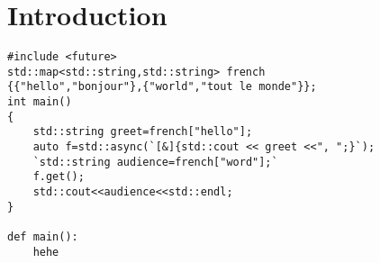 \chapter{Introduction}
\label{chapter:introduction}
\begin{lstlisting}[label=samplecode,caption=A sample]
#include <future>
std::map<std::string,std::string> french
{{"hello","bonjour"},{"world","tout le monde"}};
int main()
{
	std::string greet=french["hello"];
	auto f=std::async(`[&]{std::cout << greet <<", ";}`);
	`std::string audience=french["word"];`
	f.get();
	std::cout<<audience<<std::endl;
}

def main():
	hehe
\end{lstlisting}


